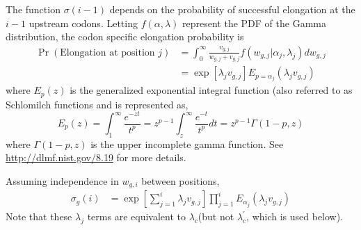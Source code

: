 \documentclass{article}
\newcommand{\waitTerm}{\ensuremath{w}\xspace}
\newcommand{\wgi}{\ensuremath{\waitTerm_{g,i}}\xspace}
\newcommand{\wgj}{\ensuremath{\waitTerm_{g,j}}\xspace}
\newcommand{\alphaj}{\ensuremath{{\alpha_j}}\xspace}
\newcommand{\lambdac}{\ensuremath{{\lambda_c}}\xspace}
\newcommand{\lambdacprime}{\ensuremath{{\lambda_c^\prime}}\xspace}
\newcommand{\lambdaj}{\ensuremath{{\lambda_j}}\xspace}
\newcommand{\nseTerm}{\ensuremath{v}\xspace}
\newcommand{\vgj}{\ensuremath{\nseTerm_{g,j}}\xspace}
\newcommand{\sigmag}{\ensuremath{\sigma_{g}}\xspace}
\begin{document}
The function $\sigma(i-1)$ depends on the probability of successful elongation at the $i-1$ upstream codons.
Letting $f(\alpha, \lambda)$ represent the PDF of the Gamma distribution, the codon specific elongation probability is
\begin{align}
  \label{eq:defElongPr}
\Pr(\text{Elongation at position $j$}) &= \int_0^\infty \frac{\vgj}{\wgj + \vgj} f\left(\wgj | \alphaj, \lambdaj\right) d\wgj\\
 &= \exp\left[\lambdaj \vgj\right] E_{p = \alphaj}\left(\lambdaj \vgj\right)
\end{align}
where $E_p(z)$ is the generalized exponential integral function (also referred to as Schlomilch functions \citep[][p.380]{OldhamEtAl2009} and is represented as,
\begin{equation}
  \label{eq:defGeneralizedExpoInt}
   E_p(z) = \int_1^\infty \frac{e^{-z t}}{t^p} = z^{p-1} \int_z^\infty \frac{e^{-t}}{t^p} dt = z^{p-1} \Gamma(1-p,z)
\end{equation}
where $\Gamma(1-p,z)$ is the upper incomplete gamma function.
See \href{http://dlmf.nist.gov/8.19}{http://dlmf.nist.gov/8.19} for more details.

Assuming independence in \wgi between positions, 
  \label{eq:defSigmag}
\begin{align}
  \sigmag(i) &=  \exp\left[\sum_{j=1}^i \lambdaj \vgj\right]  \prod_{j=1}^{i} E_{\alphaj}\left(\lambdaj \vgj\right)
\end{align}
Note that these \lambdaj terms are equivalent to \lambdac (but not \lambdacprime, which is used below).
\end{document}
